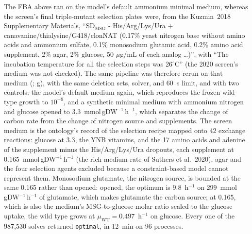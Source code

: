  The FBA above ran on the model's default ammonium
minimal medium, whereas the screen's final triple-mutant selection plates were, from the
Kuzmin~2018 Supplementary Materials, ``SD$_{\text{MSG}}$ - His/Arg/Lys/Ura +
canavanine/thialysine/G418/clonNAT (0.17\% yeast nitrogen base without amino acids and
ammonium sulfate, 0.1\% monosodium glutamic acid, 0.2\% amino acid supplement, 2\% agar, 2\%
glucose, 50 $\mu$g/mL of each analog \ldots)'', with ``The incubation temperature for all the
selection steps was 26$^{\circ}$C'' (the 2020 screen's medium was not checked). The same
pipeline was therefore rerun on that medium (;
g), with the same deletion sets, solver, and 60~s limit, and with two
controls: the model's default medium again, which reproduces the frozen wild-type growth
to $10^{-9}$, and a synthetic minimal medium with ammonium nitrogen and glucose opened to
3.3~mmol\,gDW$^{-1}$\,h$^{-1}$, which separates the change of carbon rate from the change
of nitrogen source and supplements. The screen medium is the ontology's record of the
selection recipe mapped onto 42 exchange reactions: glucose at 3.3, the YNB vitamins, and
the 17 amino acids and adenine of the supplement minus the His/Arg/Lys/Ura dropouts, each
supplement at 0.165~mmol\,gDW$^{-1}$\,h$^{-1}$ (the rich-medium rate of Suthers et
al.\ 2020), agar and the four selection agents excluded because a constraint-based model
cannot represent them. Monosodium glutamate, the nitrogen source, is bounded at the same
0.165 rather than opened: opened, the optimum is 9.8~h$^{-1}$ on 299~mmol\,gDW$^{-1}$\,h$^{-1}$
of glutamate, which makes glutamate the carbon source; at 0.165, which is also the
medium's MSG-to-glucose molar ratio scaled to the glucose uptake, the wild type grows at
$\mu_{\mathrm{WT}}=0.497$~h$^{-1}$ on glucose. Every one of the 987,530 solves returned
\texttt{optimal}, in 12~min on 96 processes.

